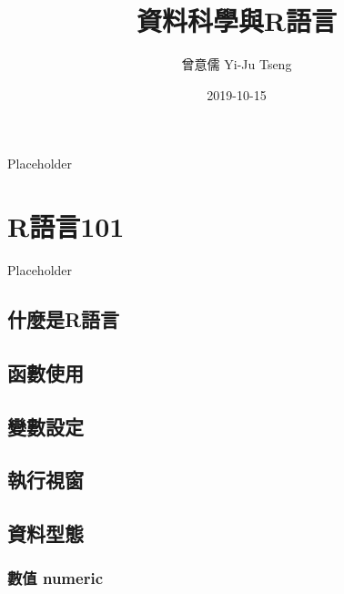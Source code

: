 \documentclass[]{book}
\title{資料科學與R語言}
\author{曾意儒 Yi-Ju Tseng}
\date{2019-10-15}
\begin{document}
\maketitle

{
\setcounter{tocdepth}{1}
\tableofcontents
}
\hypertarget{preface}{%
\chapter*{}\label{preface}}

Placeholder

\hypertarget{intro}{%
\chapter{R語言101}\label{intro}}

Placeholder

\hypertarget{ux4ec0ux9ebcux662frux8a9eux8a00}{%
\section{什麼是R語言}\label{ux4ec0ux9ebcux662frux8a9eux8a00}}

\hypertarget{ux51fdux6578ux4f7fux7528}{%
\section{函數使用}\label{ux51fdux6578ux4f7fux7528}}

\hypertarget{ux8b8aux6578ux8a2dux5b9a}{%
\section{變數設定}\label{ux8b8aux6578ux8a2dux5b9a}}

\hypertarget{ux57f7ux884cux8996ux7a97}{%
\section{執行視窗}\label{ux57f7ux884cux8996ux7a97}}

\hypertarget{DataType}{%
\section{資料型態}\label{DataType}}

\hypertarget{ux6578ux503c-numeric}{%
\subsection{數值 numeric}\label{ux6578ux503c-numeric}}
\end{document}
